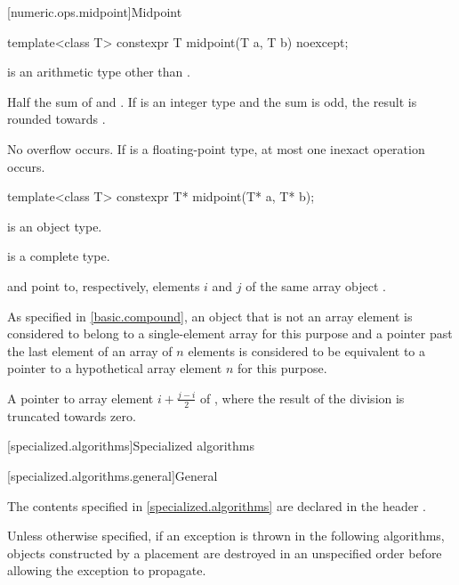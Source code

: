 [numeric.ops.midpoint]{Midpoint}

%
\begin{itemdecl}
template<class T>
  constexpr T midpoint(T a, T b) noexcept;
\end{itemdecl}
\begin{itemdescr}
\pnum
\constraints
{} is an arithmetic type other than .

\pnum
\returns
Half the sum of  and .
If  is an integer type and the sum is odd,
the result is rounded towards .

\pnum
\remarks
No overflow occurs.
If  is a floating-point type, at most one inexact operation occurs.
\end{itemdescr}

%
\begin{itemdecl}
template<class T>
  constexpr T* midpoint(T* a, T* b);
\end{itemdecl}
\begin{itemdescr}
\pnum
\constraints
{} is an object type.

\pnum
\mandates
{} is a complete type.

\pnum
\expects
{} and  point to, respectively,
elements $i$ and $j$ of the same array object .
\begin{note}
As specified in \ref{basic.compound},
an object that is not an array element
is considered to belong to a single-element array for this purpose and
a pointer past the last element of an array of $n$ elements
is considered to be equivalent to a pointer
to a hypothetical array element $n$ for this purpose.
\end{note}

\pnum
\returns
A pointer to array element $i+\frac{j-i}{2}$ of ,
where the result of the division is truncated towards zero.
\end{itemdescr}

[specialized.algorithms]{Specialized  algorithms}

[specialized.algorithms.general]{General}

\pnum
The contents specified in \ref{specialized.algorithms}
are declared in the header .

\pnum
Unless otherwise specified,
if an exception is thrown in the following algorithms,
objects constructed by a placement 
are destroyed in an unspecified order
before allowing the exception to propagate.

